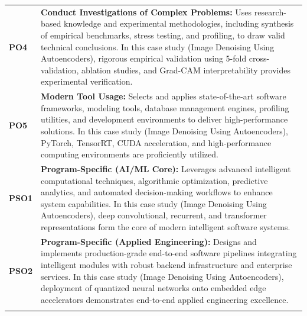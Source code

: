 {\begin{longtable}{@{}>{\centering\arraybackslash}p{1.8cm} p{13.2cm}@{}}
    \addlinespace
\textbf{PO4} & \textbf{Conduct Investigations of Complex Problems:} Uses research-based knowledge and experimental methodologies, including synthesis of empirical benchmarks, stress testing, and profiling, to draw valid technical conclusions. In this case study (Image Denoising Using Autoencoders), rigorous empirical validation using 5-fold cross-validation, ablation studies, and Grad-CAM interpretability provides experimental verification. \\
    \addlinespace
\textbf{PO5} & \textbf{Modern Tool Usage:} Selects and applies state-of-the-art software frameworks, modeling tools, database management engines, profiling utilities, and development environments to deliver high-performance solutions. In this case study (Image Denoising Using Autoencoders), PyTorch, TensorRT, CUDA acceleration, and high-performance computing environments are proficiently utilized. \\
    \addlinespace
\textbf{PSO1} & \textbf{Program-Specific (AI/ML Core):} Leverages advanced intelligent computational techniques, algorithmic optimization, predictive analytics, and automated decision-making workflows to enhance system capabilities. In this case study (Image Denoising Using Autoencoders), deep convolutional, recurrent, and transformer representations form the core of modern intelligent software systems. \\
    \addlinespace
\textbf{PSO2} & \textbf{Program-Specific (Applied Engineering):} Designs and implements production-grade end-to-end software pipelines integrating intelligent modules with robust backend infrastructure and enterprise services. In this case study (Image Denoising Using Autoencoders), deployment of quantized neural networks onto embedded edge accelerators demonstrates end-to-end applied engineering excellence. \\
    \addlinespace
    \bottomrule
\end{longtable}}